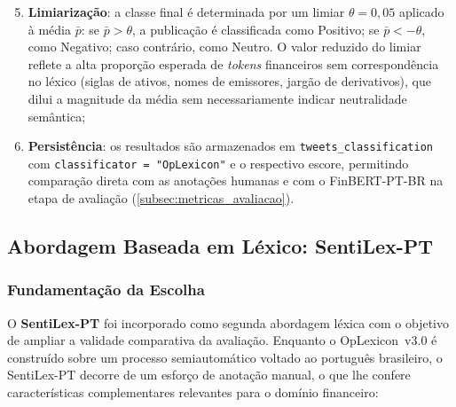 \begin{enumerate}
	\setcounter{enumi}{4}
	\item \textbf{Limiarização}: a classe final é determinada por um limiar $\theta = 0{,}05$ aplicado à média $\bar{p}$: se $\bar{p} > \theta$, a publicação é classificada como Positivo; se $\bar{p} < -\theta$, como Negativo; caso contrário, como Neutro. O valor reduzido do limiar reflete a alta proporção esperada de \textit{tokens} financeiros sem correspondência no léxico (siglas de ativos, nomes de emissores, jargão de derivativos), que dilui a magnitude da média sem necessariamente indicar neutralidade semântica;
	
	\item \textbf{Persistência}: os resultados são armazenados em \texttt{tweets\_classification} com \texttt{classificator = "OpLexicon"} e o respectivo escore, permitindo comparação direta com as anotações humanas e com o FinBERT-PT-BR na etapa de avaliação (\autoref{subsec:metricas_avaliacao}).
\end{enumerate}

\subsection{Abordagem Baseada em Léxico: SentiLex-PT}
\label{subsec:abordagem_sentilex}

\subsubsection{Fundamentação da Escolha}
\label{subsubsec:justificativa_sentilex}

O \textbf{SentiLex-PT} \cite{carvalho2015sentilex} foi incorporado como segunda abordagem léxica com o objetivo de ampliar a validade comparativa da avaliação. Enquanto o OpLexicon~v3.0 é construído sobre um processo semiautomático voltado ao português brasileiro, o SentiLex-PT decorre de um esforço de anotação manual, o que lhe confere características complementares relevantes para o domínio financeiro:

